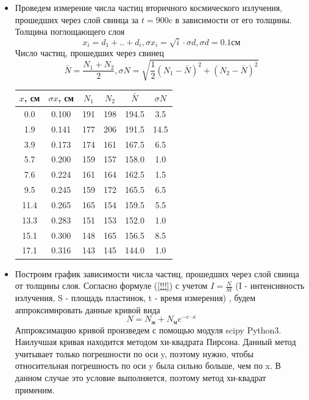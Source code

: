 \documentclass[a4paper,12pt]{article} %
\begin{document}
\begin{itemize}
\item Проведем измерение числа частиц вторичного космического излучения, прошедших через слой свинца за $t = 900$c в зависимости от его толщины.\\
Толщина поглощающего слоя
\begin{equation*}
    x_i = d_1 + .. + d_i, 
    \sigma x_i = \sqrt i \cdot \sigma d, \sigma d = 0.1 \text{см}
\end{equation*}
Число частиц, прошедших через свинец
\begin{equation*}
    \bar N = \frac{N_1 + N_2}{2}, 
    \sigma N = \sqrt{\frac{1}{2} (N_1 - \bar N)^2 + (N_2 - \bar N)^2}
\end{equation*}
\begin{table}[h!]
\centering
\begin{tabular}{|c|c|c|c|c|c|}
\hline
$x$, см & $\sigma x$, см & $N_1$ & $N_2$ & $\bar N$ & $\sigma N$ \\ \hline
0.0 & 0.100 & 191 & 198 & 194.5 & 3.5 \\ \hline
1.9 & 0.141 & 177 & 206 & 191.5 & 14.5 \\ \hline
3.9 & 0.173 & 174 & 161 & 167.5 & 6.5 \\ \hline
5.7 & 0.200 & 159 & 157 & 158.0 & 1.0 \\ \hline
7.6 & 0.224 & 161 & 164 & 162.5 & 1.5 \\ \hline
9.5 & 0.245 & 159 & 172 & 165.5 & 6.5 \\ \hline
11.4 & 0.265 & 165 & 154 & 159.5 & 5.5 \\ \hline
13.3 & 0.283 & 151 & 153 & 152.0 & 1.0 \\ \hline
15.1 & 0.300 & 148 & 165 & 156.5 & 8.5 \\ \hline
17.1 & 0.316 & 143 & 145 & 144.0 & 1.0 \\ \hline
\end{tabular}
\end{table}
\item Построим график зависимости числа частиц, прошедших через слой свинца от толщины слоя. Согласно формуле (\ref{!!!}) с учетом $I = \frac{N}{St}$ (I - интенсивность излучения, S - площадь пластинок, t - время измерения) , будем аппроксимировать данные кривой вида 
\begin{equation*}
    N = N_{\text{ж}} + N_{\text{м}} e^{-c \cdot x}
\end{equation*}
Аппроксимацию кривой произведем с помощью модуля scipy Python3. Наилучшая кривая находится методом хи-квадрата Пирсона. Данный метод учитывает только погрешности по оси y, поэтому нужно, чтобы относительная погрешность по оси y была сильно больше, чем по x. В данном случае это условие выполняется, поэтому метод хи-квадрат применим. \\\\

\end{itemize}
\end{document}
